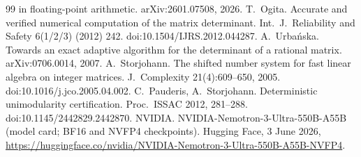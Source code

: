 \documentclass[11pt]{article}
\begin{document}
\begin{thebibliography}{99}
in floating-point arithmetic. arXiv:2601.07508, 2026.
 T.~Ogita. Accurate and verified numerical computation of the matrix determinant. Int.\ J.\ Reliability and
Safety 6(1/2/3) (2012) 242. doi:10.1504/IJRS.2012.044287.
 A.~Urba\'nska. Towards an exact adaptive algorithm for the determinant of a rational matrix.
arXiv:0706.0014, 2007.
 A.~Storjohann. The shifted number system for fast linear algebra on integer matrices. J.\ Complexity 21(4):609--650, 2005. doi:10.1016/j.jco.2005.04.002.
 C.~Pauderis, A.~Storjohann. Deterministic unimodularity certification. Proc.\ ISSAC 2012, 281--288.
doi:10.1145/2442829.2442870.
 NVIDIA. NVIDIA-Nemotron-3-Ultra-550B-A55B (model card; BF16 and NVFP4 checkpoints). Hugging Face, 3 June 2026,
\url{https://huggingface.co/nvidia/NVIDIA-Nemotron-3-Ultra-550B-A55B-NVFP4}.
\end{thebibliography}
\end{document}
